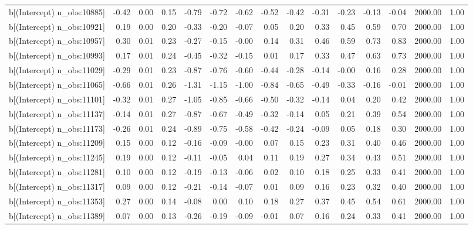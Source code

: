 \begin{table}[ht]
\begin{tabular}{rrrrrrrrrrrrrrr}
  b[(Intercept) n\_obs:10885] & -0.42 & 0.00 & 0.15 & -0.79 & -0.72 & -0.62 & -0.52 & -0.42 & -0.31 & -0.23 & -0.13 & -0.04 & 2000.00 & 1.00 \\ 
  b[(Intercept) n\_obs:10921] & 0.19 & 0.00 & 0.20 & -0.33 & -0.20 & -0.07 & 0.05 & 0.20 & 0.33 & 0.45 & 0.59 & 0.70 & 2000.00 & 1.00 \\ 
  b[(Intercept) n\_obs:10957] & 0.30 & 0.01 & 0.23 & -0.27 & -0.15 & -0.00 & 0.14 & 0.31 & 0.46 & 0.59 & 0.73 & 0.83 & 2000.00 & 1.00 \\ 
  b[(Intercept) n\_obs:10993] & 0.17 & 0.01 & 0.24 & -0.45 & -0.32 & -0.15 & 0.01 & 0.17 & 0.33 & 0.47 & 0.63 & 0.73 & 2000.00 & 1.00 \\ 
  b[(Intercept) n\_obs:11029] & -0.29 & 0.01 & 0.23 & -0.87 & -0.76 & -0.60 & -0.44 & -0.28 & -0.14 & -0.00 & 0.16 & 0.28 & 2000.00 & 1.00 \\ 
  b[(Intercept) n\_obs:11065] & -0.66 & 0.01 & 0.26 & -1.31 & -1.15 & -1.00 & -0.84 & -0.65 & -0.49 & -0.33 & -0.16 & -0.01 & 2000.00 & 1.00 \\ 
  b[(Intercept) n\_obs:11101] & -0.32 & 0.01 & 0.27 & -1.05 & -0.85 & -0.66 & -0.50 & -0.32 & -0.14 & 0.04 & 0.20 & 0.42 & 2000.00 & 1.00 \\ 
  b[(Intercept) n\_obs:11137] & -0.14 & 0.01 & 0.27 & -0.87 & -0.67 & -0.49 & -0.32 & -0.14 & 0.05 & 0.21 & 0.39 & 0.54 & 2000.00 & 1.00 \\ 
  b[(Intercept) n\_obs:11173] & -0.26 & 0.01 & 0.24 & -0.89 & -0.75 & -0.58 & -0.42 & -0.24 & -0.09 & 0.05 & 0.18 & 0.30 & 2000.00 & 1.00 \\ 
  b[(Intercept) n\_obs:11209] & 0.15 & 0.00 & 0.12 & -0.16 & -0.09 & -0.00 & 0.07 & 0.15 & 0.23 & 0.31 & 0.40 & 0.46 & 2000.00 & 1.00 \\ 
  b[(Intercept) n\_obs:11245] & 0.19 & 0.00 & 0.12 & -0.11 & -0.05 & 0.04 & 0.11 & 0.19 & 0.27 & 0.34 & 0.43 & 0.51 & 2000.00 & 1.00 \\ 
  b[(Intercept) n\_obs:11281] & 0.10 & 0.00 & 0.12 & -0.19 & -0.13 & -0.06 & 0.02 & 0.10 & 0.18 & 0.25 & 0.33 & 0.41 & 2000.00 & 1.00 \\ 
  b[(Intercept) n\_obs:11317] & 0.09 & 0.00 & 0.12 & -0.21 & -0.14 & -0.07 & 0.01 & 0.09 & 0.16 & 0.23 & 0.32 & 0.40 & 2000.00 & 1.00 \\ 
  b[(Intercept) n\_obs:11353] & 0.27 & 0.00 & 0.14 & -0.08 & 0.00 & 0.10 & 0.18 & 0.27 & 0.37 & 0.45 & 0.54 & 0.61 & 2000.00 & 1.00 \\ 
  b[(Intercept) n\_obs:11389] & 0.07 & 0.00 & 0.13 & -0.26 & -0.19 & -0.09 & -0.01 & 0.07 & 0.16 & 0.24 & 0.33 & 0.41 & 2000.00 & 1.00 \\ 

\end{tabular}
\end{table}
